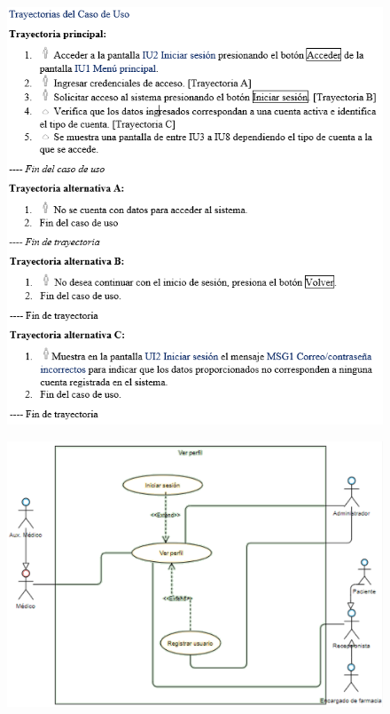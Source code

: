 \documentclass[12pt,letterpaper]{article}
\begin{document}
{\begin{figure}[H]
        \end{figure}
        \begin{figure}[H]
            \centering
            \includegraphics [scale=0.9]{trayectorias}
        \end{figure}
        \begin{figure}[H]
            \centering
            \includegraphics [scale=0.5]{verPerfil}

\end{figure}}
\end{document}
